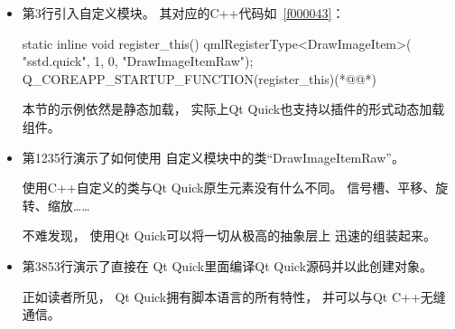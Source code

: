 \begin{itemize}

\item 第3行引入自定义模块。
其对应的C{\sourcefonttwo{}+}{\sourcefonttwo{}+}代码如\filesourcenumbernameone\ \ref{f000043}：
\label{f000043}    %
\FloatBarrier                                  %
\begin{thebookfilesourceone}[escapeinside={(*@}{@*)},
caption=GoodLuck,
title=\filesourcenumbernameone \thefilesourcenumber
]
static inline void register_this() {
    qmlRegisterType<DrawImageItem>(
        "sstd.quick",
        1, 0,
        "DrawImageItemRaw");
}
Q_COREAPP_STARTUP_FUNCTION(register_this)(*@\marginpar[\hfill\setlength\fboxsep{2pt}\fbox{\footnotesize{\kaishu\parbox{1em}{\setlength{\baselineskip}{2pt}\filesourcenumbernameone}}\footnotesize{\thefilesourcenumber}}]{\setlength\fboxsep{2pt}\fbox{\footnotesize{\kaishu\parbox{1em}{\setlength{\baselineskip}{2pt}\filesourcenumbernameone}}\footnotesize{\thefilesourcenumber}}}@*)\end{thebookfilesourceone}          %
\addtocounter{lstlisting}{-1}   %


本节的示例依然是静态加载，
实际上Qt Quick也支持以插件的形式动态加载组件。

\item 第12\raisebox{0.16ex}{\sourcefonttwo\~{}}35行演示了如何使用
自定义模块中的类“DrawImageItemRaw”。

使用C{\sourcefonttwo{}+}{\sourcefonttwo{}+}自定义的类与Qt Quick原生元素没有什么不同。
信号槽、平移、旋转、缩放……

不难发现，
使用Qt Quick可以将一切从极高的抽象层上
迅速的组装起来。

\item 第38\raisebox{0.16ex}{\sourcefonttwo\~{}}53行演示了直接在
Qt Quick里面编译Qt Quick源码并以此创建对象。

正如读者所见，
Qt Quick拥有脚本语言的所有特性，
并可以与Qt C{\sourcefonttwo{}+}{\sourcefonttwo{}+}无缝通信。

\end{itemize}













